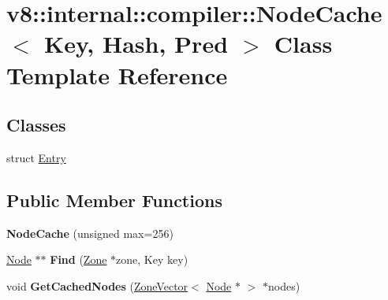 \hypertarget{classv8_1_1internal_1_1compiler_1_1_node_cache}{}\section{v8\+:\+:internal\+:\+:compiler\+:\+:Node\+Cache$<$ Key, Hash, Pred $>$ Class Template Reference}
\label{classv8_1_1internal_1_1compiler_1_1_node_cache}
\subsection*{Classes}
\begin{DoxyCompactItemize}
\item 
struct \hyperlink{structv8_1_1internal_1_1compiler_1_1_node_cache_1_1_entry}{Entry}
\end{DoxyCompactItemize}
\subsection*{Public Member Functions}
\begin{DoxyCompactItemize}
\item 
{\bfseries Node\+Cache} (unsigned max=256)\hypertarget{classv8_1_1internal_1_1compiler_1_1_node_cache_a54b9055ef8f7ab3557bc22bae6afca9e}{}\label{classv8_1_1internal_1_1compiler_1_1_node_cache_a54b9055ef8f7ab3557bc22bae6afca9e}

\item 
\hyperlink{classv8_1_1internal_1_1compiler_1_1_node}{Node} $\ast$$\ast$ {\bfseries Find} (\hyperlink{classv8_1_1internal_1_1_zone}{Zone} $\ast$zone, Key key)\hypertarget{classv8_1_1internal_1_1compiler_1_1_node_cache_a216746465c6fb661212af18943e8c322}{}\label{classv8_1_1internal_1_1compiler_1_1_node_cache_a216746465c6fb661212af18943e8c322}

\item 
void {\bfseries Get\+Cached\+Nodes} (\hyperlink{classv8_1_1internal_1_1_zone_vector}{Zone\+Vector}$<$ \hyperlink{classv8_1_1internal_1_1compiler_1_1_node}{Node} $\ast$ $>$ $\ast$nodes)\hypertarget{classv8_1_1internal_1_1compiler_1_1_node_cache_a88c0982654f7bfab0ac18ae287910dd5}{}\label{classv8_1_1internal_1_1compiler_1_1_node_cache_a88c0982654f7bfab0ac18ae287910dd5}

\end{DoxyCompactItemize}
